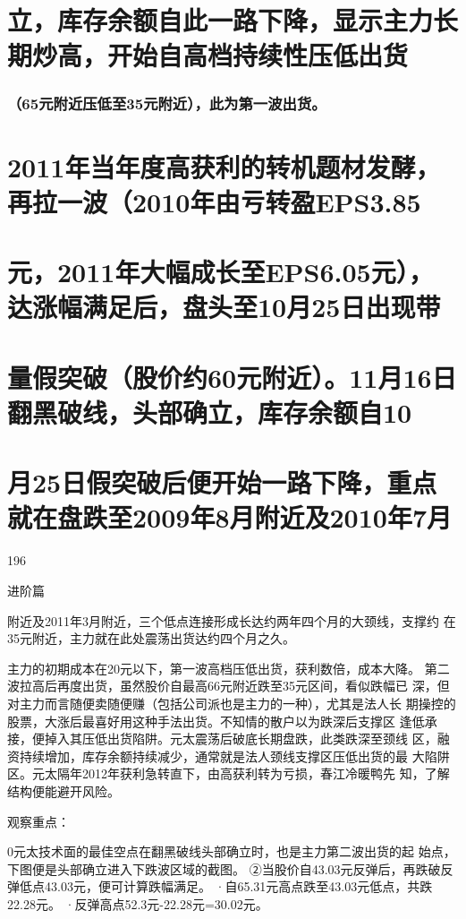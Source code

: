 \documentclass{article}
\begin{document}
\section{立，库存余额自此一路下降，显示主力长期炒高，开始自高档持续性压低出货}

\subsubsection{（65元附近压低至35元附近），此为第一波出货。}

\section{2011年当年度高获利的转机题材发酵，再拉一波（2010年由亏转盈EPS3.85}

\section{元，2011年大幅成长至EPS6.05元），达涨幅满足后，盘头至10月25日出现带}

\section{量假突破（股价约60元附近）。11月16日翻黑破线，头部确立，库存余额自10}

\section{月25日假突破后便开始一路下降，重点就在盘跌至2009年8月附近及2010年7月}

196

\clearpage

进阶篇

附近及2011年3月附近，三个低点连接形成长达约两年四个月的大颈线，支撑约 在35元附近，主力就在此处震荡出货达约四个月之久。

主力的初期成本在20元以下，第一波高档压低出货，获利数倍，成本大降。 第二波拉高后再度出货，虽然股价自最高66元附近跌至35元区间，看似跌幅已 深，但对主力而言随便卖随便赚（包括公司派也是主力的一种），尤其是法人长 期操控的股票，大涨后最喜好用这种手法出货。不知情的散户以为跌深后支撑区 逢低承接，便掉入其压低出货陷阱。元太震荡后破底长期盘跌，此类跌深至颈线 区，融资持续增加，库存余额持续减少，通常就是法人颈线支撑区压低出货的最 大陷阱区。元太隔年2012年获利急转直下，由高获利转为亏损，春江冷暖鸭先 知，了解结构便能避开风险。

观察重点：

0元太技术面的最佳空点在翻黑破线头部确立时，也是主力第二波出货的起 始点，下图便是头部确立进入下跌波区域的截图。 ②当股价自43.03元反弹后，再跌破反弹低点43.03元，便可计算跌幅满足。 ·自65.31元高点跌至43.03元低点，共跌22.28元。 ·反弹高点52.3元-22.28元=30.02元。
\end{document}
